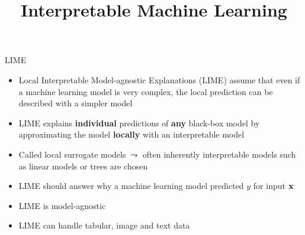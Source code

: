\documentclass[11pt,compress,t,notes=noshow, aspectratio=169, xcolor=table]{beamer}
\title{Interpretable Machine Learning}
\date{}
\begin{document}
	




\newcommand{\titlefigure}{figure/lime5}
\newcommand{\learninggoals}{
	\item Understand motivation for LIME
	\item Develop a mathematical intuition
	\item See various applications}



\begin{frame}[c]{LIME}
\begin{itemize}
		\item Local Interpretable Model-agnostic Explanations (LIME) assume that even if a machine learning model is very complex, the local prediction can be described with a simpler model
		\smallskip\pause
		\item  LIME explains \textbf{individual} predictions of \textbf{any} black-box model by approximating the model \textbf{locally} with an interpretable model
		\smallskip\pause
		\item Called local surrogate models $\leadsto$ often inherently interpretable models such as linear models or trees are chosen
		\smallskip\pause
		\item LIME should answer why a machine learning model predicted $y$ for input $\xv$
		\smallskip\pause
		\item LIME is model-agnostic  
		\smallskip\pause
		\item LIME can handle tabular, image and text data 
\end{itemize}
\end{frame}
\end{document}

